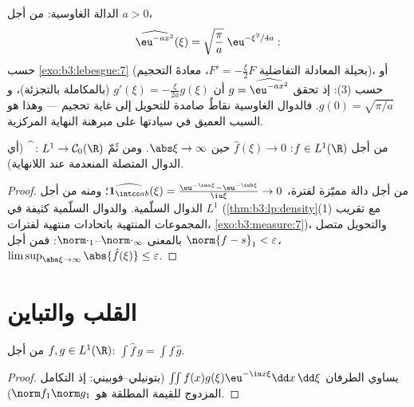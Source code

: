 \begin{example}\label{ex:b3:fouriertransform:gaussian}
الدالة الغاوسية: من أجل $a > 0$،
\[
\widehat{\eu^{-ax^2}}(\xi) =
\sqrt{\frac\pi a}\;\eu^{-\xi^2/4a} :
\]
حسب \cref{exo:b3:lebesgue:7} (بحيلة المعادلة التفاضلية $F' = -\frac\xi{2}F$، معادةَ
التحجيم)، أو حسب (3): إذ تحقق $g = \widehat{\eu^{-ax^2}}$ أن $g'(\xi) = -\frac{\xi}{2a}g(\xi)$ (بالمكاملة
بالتجزئة)، و $g(0) = \sqrt{\pi/a}$. فالدوال الغاوسية نقاطٌ صامدة للتحويل إلى
غاية تحجيم --- وهذا هو السبب العميق في سيادتها على مبرهنة
النهاية المركزية.
\end{example}

\begin{theorem}
\label{thm:b3:fouriertransform:riemannlebesgue}
من أجل $f \in L^1(\R)$: $\hat f(\xi) \to 0$ حين $\abs\xi \to
\infty$. ومن ثَمّ $\widehat{\phantom f} \colon L^1 \to \mathcal
C_0(\R)$ (أي
الدوال المتصلة المنعدمة عند اللانهاية).
\end{theorem}

\begin{proof}
من أجل دالة مميّزة لفترة، $\widehat{\mathbf 1_{\intcc
ab}}(\xi) = \frac{\eu^{-\iu a\xi} - \eu^{-\iu b\xi}}{\iu\xi}
\to 0$؛ ومنه من أجل الدوال السلّمية.
والدوال السلّمية كثيفة في $L^1$ (\cref{thm:b3:lp:density}(1) مع تقريب
المجموعات المنتهية  باتحادات منتهية لفترات، \cref{exo:b3:measure:7})،
والتحويل متصل بالمعنى $\norm\cdot_\infty$--$\norm\cdot_1$: فمن أجل $\norm{f -
s}_1 < \varepsilon$،
$\limsup_{\abs\xi\to\infty}\abs{\hat
f(\xi)} \leq \varepsilon$.
\end{proof}

\section{القلب والتباين}

\begin{lemma}
\label{lem:b3:fouriertransform:multiplication}
من أجل $f, g \in L^1(\R)$: $\displaystyle\int \hat f\,g =
\int f\,\hat g$.
\end{lemma}

\begin{proof}
يساوي الطرفان $\iint f(x)g(\xi)\eu^{-\iu x\xi}\dd
x\,\dd\xi$ (بتونيلي--فوبيني: إذ التكامل المزدوج
للقيمة المطلقة هو $\norm f_1\norm g_1$).
\end{proof}

